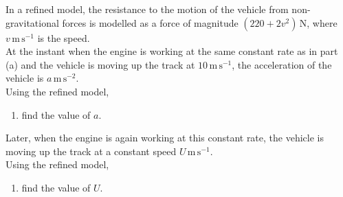 \documentclass[leqno]{article}
\begin{document}
\begin{enumerate}[
  label=\textbf{\arabic*.},
  leftmargin=*,
  topsep=0pt,
  partopsep=0pt,
  parsep=0pt
]
In a refined model, the resistance to the motion of the vehicle from non-gravitational forces is modelled as a force of magnitude $(220 + 2v^2)\,\mathrm{N}$, where $v\,\mathrm{m\,s^{-1}}$ is the speed. \\

At the instant when the engine is working at the same constant rate as in part (a) and the vehicle is moving up the track at $10\,\mathrm{m\,s^{-1}}$, the acceleration of the vehicle is $a\,\mathrm{m\,s^{-2}}$. \\

Using the refined model, \\

\begin{enumerate}[label=\textbf{(\alph*)}, resume]
  \item find the value of $a$.  \\
\end{enumerate}

Later, when the engine is again working at this constant rate, the vehicle is moving up the track at a constant speed $U\,\mathrm{m\,s^{-1}}$. \\

Using the refined model, \\

\begin{enumerate}[label=\textbf{(\alph*)}, resume]
  \item find the value of $U$.  \\
\end{enumerate}
\end{enumerate}
\end{document}
